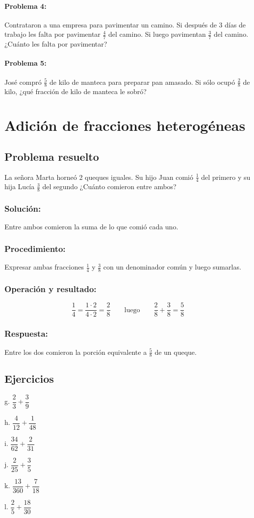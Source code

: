 \documentclass[10pt,twoside]{article}
\begin{document}
\paragraph*{Problema 4:} Contrataron a una empresa para pavimentar un camino. Si después de 3 días de trabajo les falta por pavimentar $\frac{4}{7}$ del camino. Si luego pavimentan $\frac{3}{7}$ del camino. ¿Cuánto les falta por pavimentar?
\paragraph*{Problema 5:} José compró $\frac{5}{8}$ de kilo de manteca para preparar pan amasado. Si sólo ocupó $\frac{2}{8}$ de kilo, ¿qué fracción de kilo de manteca le sobró?
\section*{Adici\'{o}n de fracciones heterog\'{e}neas}
\subsection*{Problema resuelto}
La señora Marta horneó 2 queques iguales. Su hijo Juan comió $\frac{1}{4}$ del primero y su hija Lucía $\frac{3}{8}$ del segundo ¿Cuánto comieron entre ambos? 
\subsubsection*{Solución:} Entre ambos comieron la suma de lo que comió cada uno.
\subsubsection*{Procedimiento:} Expresar ambas fracciones $\frac{1}{4}$ y $\frac{3}{8}$ con un denominador común y luego sumarlas.
\subsubsection*{Operaci\'{o}n y resultado:}
\[\dfrac{1}{4}=\dfrac{1\cdot 2}{4\cdot 2}=\dfrac{2}{8}\qquad \mbox {luego} \qquad \dfrac{2}{8}+\dfrac{3}{8}=\dfrac{5}{8}\]
\subsubsection*{Respuesta:} Entre los dos comieron la porción equivalente a $\frac{5}{8}$ de un queque.
\subsection*{Ejercicios}
\begin{enumerate}
\begin{multicols}{3}
\item[g.] $\dfrac{2}{3}+\dfrac{3}{9}$
\item[h.] $\dfrac{4}{12}+\dfrac{1}{48}$
\item[i.] $\dfrac{34}{62}+\dfrac{2}{31}$
\item[j.] $\dfrac{2}{25}+\dfrac{3}{5}$
\item[k.] $\dfrac{13}{360}+\dfrac{7}{18}$
\item[l.] $\dfrac{2}{5}+\dfrac{18}{30}$
\end{multicols}
\end{enumerate}
\end{document}
